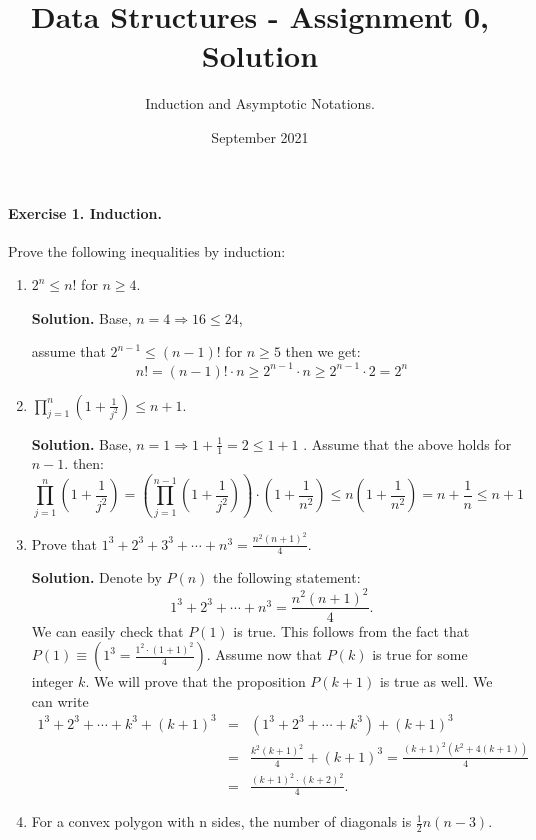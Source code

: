 \title{Data Structures - Assignment 0, Solution} 
\author{Induction and Asymptotic Notations.}
\date{September 2021}


\paragraph{Exercise 1. Induction.}Prove the following inequalities by induction:
\begin{enumerate}
    \item \( 2^n \le n!\) for \(n\ge 4\).
    
    \textbf{Solution.} Base, \(n=4 \Rightarrow 16\le 24\),
    
    assume that \(2^{n-1} \le (n-1)! \) for \(n\ge 5\) then we get: \[ n! = (n-1)! \cdot n \ge 2^{n-1} \cdot n \ge 2^{n-1} \cdot 2 = 2^{n} \] 
    \item \(\prod^{n}_{j=1}{\left(1 +\frac{1}{j^2}\right)} \le n+1\).
    
    \textbf{Solution.} Base, \( n = 1 \Rightarrow 1+\frac{1}{1} = 2 \le 1 + 1\) . Assume that the above holds for \(n-1\). then: \[\prod^{n}_{j=1}{\left(1 +\frac{1}{j^2}\right)} = \left(\prod^{n-1}_{j=1}{\left(1 +\frac{1}{j^2}\right)}\right) \cdot \left(1+\frac{1}{n^2}\right) \le n\left(1+\frac{1}{n^2}\right) = n + \frac{1}{n} \le n+1\]
    \item Prove that \( \displaystyle 1^3+2^3+3^3+\cdots+ n^3=\frac{n^2(n+1)^2}4 \).
    
    \textbf{Solution.} Denote by \( P(n) \) the following statement: \[ 1^3+2^3+\cdots+  n^3=\frac{n^2(n+1)^2}4.\] We can easily check that \( P(1) \) is true. This follows from the fact that \( \displaystyle P(1)\equiv\left( 1^3= \frac{1^2\cdot (1+1)^2}{4}\right) \).
Assume now that \( P(k) \) is true for some integer \( k \). We will prove that the proposition \( P(k+1) \) is true as well. We can write \begin{eqnarray*}
1^3+2^3+\cdots+ k^3+(k+1)^3&=&\left(1^3+2^3+\cdots+ k^3\right)+(k+1)^3\\
&=&\frac{k^2(k+1)^2}{4}+(k+1)^3=\frac{(k+1)^2\left(k^2+4(k+1)\right)}4\\
&=&\frac{(k+1)^2\cdot(k+2)^2}{4}.
\end{eqnarray*}


\item For a convex polygon with n sides, the number of diagonals is \(\frac{1}{2}n\left(n-3\right)\).
    

\end{enumerate}
